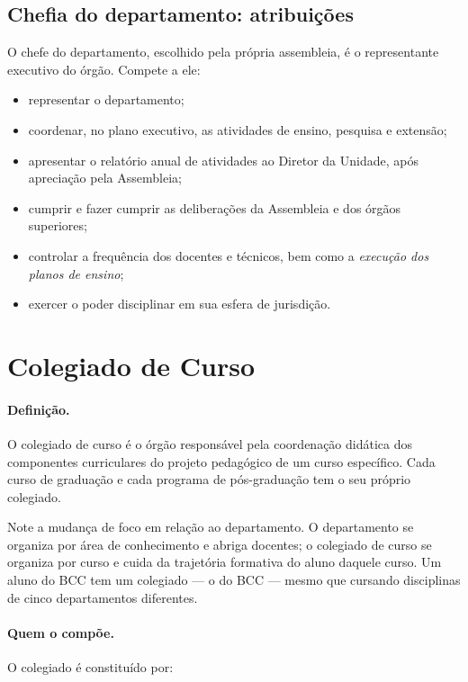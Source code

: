 \documentclass[10pt,a4paper]{extarticle}
\newcommand{\impt}[1]{\textcolor{important}{#1}}
\newcommand{\ntc}[1]{\textcolor{notice}{#1}}
\begin{document}
\subsection{Chefia do departamento: atribuições}

O chefe do departamento, escolhido pela própria assembleia, é o representante executivo do órgão. Compete a ele:

\begin{itemize}
    \item representar o departamento;
    \item coordenar, no plano executivo, as atividades de ensino, pesquisa e extensão;
    \item apresentar o relatório anual de atividades ao Diretor da Unidade, após apreciação pela Assembleia;
    \item cumprir e fazer cumprir as deliberações da Assembleia e dos órgãos superiores;
    \item controlar a frequência dos docentes e técnicos, bem como a \emph{execução dos planos de ensino};
    \item exercer o poder disciplinar em sua esfera de jurisdição.
\end{itemize}

\section{Colegiado de Curso}

\paragraph{Definição.} O colegiado de curso é o órgão responsável pela \impt{coordenação didática} dos componentes curriculares do projeto pedagógico de um curso específico. Cada curso de graduação e cada programa de pós-graduação tem o seu próprio colegiado.

\ntc{Note a mudança de foco em relação ao departamento. O departamento se organiza por área de conhecimento e abriga docentes; o colegiado de curso se organiza por curso e cuida da trajetória formativa do aluno daquele curso. Um aluno do BCC tem um colegiado --- o do BCC --- mesmo que cursando disciplinas de cinco departamentos diferentes.}

\paragraph{Quem o compõe.} O colegiado é constituído por:
\end{document}
